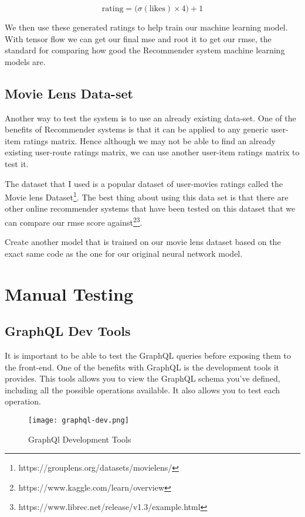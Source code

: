 \begin{equation} \label{eqn:RatingCalculation}
    \textrm{rating} = \big(\sigma(\textrm{likes}) \times 4\big) + 1
\end{equation}

We then use these generated ratings to help train our machine learning model. With tensor flow we can get our final \acrshort{mse} and root it to get our \acrfull{rmse}, the standard for comparing how good the Recommender system machine learning models are.

\subsection{Movie Lens Data-set}
Another way to test the system is to use an already existing data-set. One of the benefits of Recommender systems is that it can be applied to any generic user-item ratings matrix. Hence although we may not be able to find an already existing user-route ratings matrix, we can use another user-item ratings matrix to test it.

The dataset that I used is a popular dataset of user-movies ratings called the Movie lens Dataset\footnote{https://grouplens.org/datasets/movielens/}. The best thing about using this data set is that there are other online recommender systems that have been tested on this dataset that we can compare our \acrshort{rmse} score against\footnote{https://www.kaggle.com/learn/overview}\footnote{https://www.librec.net/release/v1.3/example.html}.

Create another model that is trained on our movie lens dataset based on the exact same code as the one for our original neural network model.

\section{Manual Testing}

\subsection{GraphQL Dev Tools}
It is important to be able to test the GraphQL queries before exposing them to the front-end. One of the benefits with GraphQL is the development tools it provides. This tools allows you to view the GraphQL schema you've defined, including all the possible operations available. It also allows you to test each operation.
\begin{figure}[ht]
    \centering
    \texttt{[image: graphql-dev.png]}
    \caption{GraphQl Development Tools}
    \label{fig:graphQLDevTools}
\end{figure}

